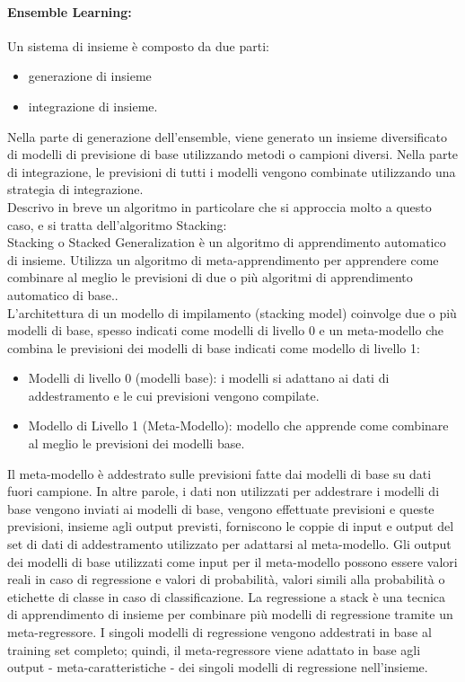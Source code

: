\documentclass[12pt,a4paper]{report}
\begin{document}
\paragraph*{Ensemble Learning:}
Un sistema di insieme è composto da due parti: \cite{towards:demandForecast}
\begin{itemize}
    \item generazione di insieme
    \item integrazione di insieme.
\end{itemize}
Nella parte di generazione dell'ensemble, viene generato un insieme diversificato di modelli di previsione di base utilizzando metodi o campioni diversi. Nella parte di integrazione, le previsioni di tutti i modelli vengono combinate utilizzando una strategia di integrazione.\\

Descrivo in breve un algoritmo in particolare che si approccia molto a questo caso, e si tratta dell'algoritmo Stacking:\\
Stacking o Stacked Generalization è un algoritmo di apprendimento automatico di insieme. Utilizza un algoritmo di meta-apprendimento per apprendere come combinare al meglio le previsioni di due o più algoritmi di apprendimento automatico di base..\\
L'architettura di un modello di impilamento (stacking model) coinvolge due o più modelli di base, spesso indicati come modelli di livello 0 e un meta-modello che combina le previsioni dei modelli di base indicati come modello di livello 1:
\begin{itemize}
    \item Modelli di livello 0 (modelli base): i modelli si adattano ai dati di addestramento e le cui previsioni vengono compilate.
    \item Modello di Livello 1 (Meta-Modello): modello che apprende come combinare al meglio le previsioni dei modelli base.
\end{itemize}
Il meta-modello è addestrato sulle previsioni fatte dai modelli di base su dati fuori campione. In altre parole, i dati non utilizzati per addestrare i modelli di base vengono inviati ai modelli di base, vengono effettuate previsioni e queste previsioni, insieme agli output previsti, forniscono le coppie di input e output del set di dati di addestramento utilizzato per adattarsi al meta-modello. Gli output dei modelli di base utilizzati come input per il meta-modello possono essere valori reali in caso di regressione e valori di probabilità, valori simili alla probabilità o etichette di classe in caso di classificazione.
La regressione a stack è una tecnica di apprendimento di insieme per combinare più modelli di regressione tramite un meta-regressore. I singoli modelli di regressione vengono addestrati in base al training set completo; quindi, il meta-regressore viene adattato in base agli output - meta-caratteristiche - dei singoli modelli di regressione nell'insieme.\\
\end{document}
